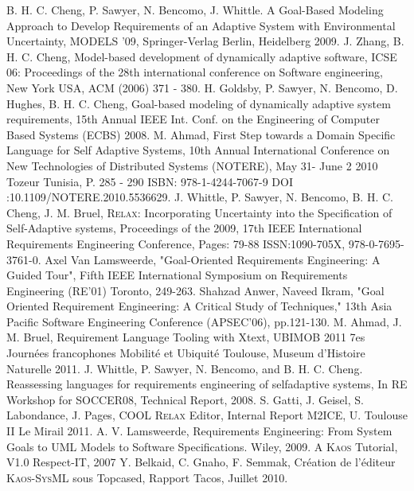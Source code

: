 \documentclass[10pt, conference, compsocconf]{IEEEtran}
\def\myrelax{\textsc{Relax}}                  %
\def\sysml{\textsc{SysML}}
\def\kaos{\textsc{Kaos}}
\begin{document}


\begin{thebibliography}{1}
B. H. C. Cheng, P. Sawyer, N. Bencomo, J. Whittle. A Goal-Based Modeling Approach to Develop Requirements of an Adaptive System with Environmental Uncertainty, MODELS '09, Springer-Verlag Berlin, Heidelberg 2009.
J. Zhang, B. H. C. Cheng, Model-based development of dynamically adaptive software, ICSE 06: Proceedings of the 28th international conference on Software engineering, New York USA, ACM (2006) 371 - 380.
H. Goldsby, P.  Sawyer, N. Bencomo, D. Hughes, B. H. C. Cheng, Goal-based modeling of dynamically adaptive system requirements, 15th Annual IEEE Int. Conf. on the Engineering of Computer Based Systems (ECBS) 2008.
M. Ahmad, First Step towards a Domain Specific Language for Self Adaptive Systems, 10th Annual International Conference on New Technologies of Distributed Systems (NOTERE), May 31- June 2 2010 Tozeur Tunisia, P. 285 - 290 ISBN: 978-1-4244-7067-9 DOI :10.1109/NOTERE.2010.5536629.
J. Whittle, P. Sawyer, N. Bencomo, B. H. C. Cheng, J. M. Bruel, \myrelax{}: Incorporating Uncertainty into the Specification of Self-Adaptive systems, Proceedings of the 2009, 17th IEEE International Requirements Engineering Conference, Pages: 79-88 ISSN:1090-705X, 978-0-7695-3761-0.
Axel Van Lamsweerde, "Goal-Oriented Requirements Engineering: A Guided Tour", Fifth IEEE International Symposium on Requirements Engineering (RE'01) Toronto, 249-263.
Shahzad Anwer, Naveed Ikram, "Goal Oriented Requirement Engineering: A Critical Study of Techniques," 13th Asia Pacific Software Engineering Conference (APSEC'06), pp.121-130.
M. Ahmad, J. M. Bruel, Requirement Language Tooling with Xtext, UBIMOB 2011 7es Journ\'ees francophones Mobilit\'e et Ubiquit\'e Toulouse, Museum d'Histoire Naturelle 2011.
J. Whittle, P. Sawyer, N. Bencomo, and B. H. C. Cheng. Reassessing languages for requirements engineering of selfadaptive systems, In RE Workshop for SOCCER08, Technical Report, 2008.
S. Gatti, J. Geisel, S. Labondance, J. Pages, COOL \myrelax{} Editor, Internal Report M2ICE, U. Toulouse II Le Mirail 2011.
A. V. Lamsweerde, Requirements Engineering: From System Goals to UML Models to Software Specifications. Wiley, 2009.
A \kaos{} Tutorial, V1.0  Respect-IT, 2007
Y. Belkaid, C. Gnaho, F. Semmak, Cr\'eation de l'\'editeur \kaos{}-\sysml{} sous Topcased, Rapport Tacos, Juillet 2010.


\end{thebibliography}
\end{document}
